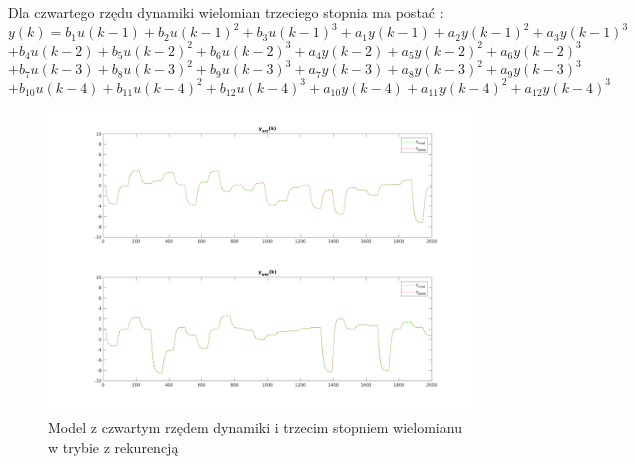 \documentclass[a4paper, 11pt]{article}
\begin{document}
Dla czwartego rzędu dynamiki wielomian trzeciego stopnia ma postać : 
$$y(k) = b_1u(k-1)+b_2u(k-1)^2+b_3u(k-1)^3 + a_1y(k-1)+ a_2y(k-1)^2+a_3y(k-1)^3$$
$$+b_4u(k-2)+b_5u(k-2)^2+b_6u(k-2)^3 + a_4y(k-2)+ a_5y(k-2)^2+a_6y(k-2)^3$$
$$+b_7u(k-3)+b_8u(k-3)^2+b_9u(k-3)^3 + a_7y(k-3)+ a_8y(k-3)^2+a_9y(k-3)^3$$
$$+b_{10}u(k-4)+b_{11}u(k-4)^2+b_{12}u(k-4)^3 + a_{10}y(k-4)+ a_{11}y(k-4)^2+a_{12}y(k-4)^3$$
\begin{figure}[H]
\centering
\includegraphics[scale=0.50]{dane_dyn_mod_rek_D_4N_3.png}
\caption{Model z czwartym rzędem dynamiki i trzecim stopniem wielomianu w trybie z rekurencją }
\label{}
\end{figure}
\end{document}
